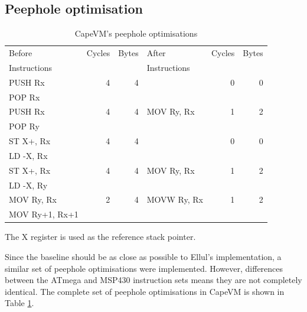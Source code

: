 \subsection{Peephole optimisation}
\begin{table}
\caption{CapeVM's peephole optimisations}
\label{tbl-CapeVM-peephole}
    \begin{threeparttable}
    \begin{tabular}{lrrlrr} %
    \toprule
    Before         & Cycles & Bytes   & After        & Cycles & Bytes   \\
    Instructions   &        &         & Instructions &        &         \\
    \midrule
    \midrule
    PUSH Rx        & 4      & 4       &              & 0      & 0 \\
    POP Rx         &        &         &              &        & \\
    \midrule
    PUSH Rx        & 4      & 4       & MOV Ry, Rx   & 1      & 2 \\
    POP Ry         &        &         &              &        & \\
    \midrule
    ST X+, Rx      & 4      & 4       &              & 0      & 0 \\
    LD -X, Rx      &        &         &              &        & \\
    \midrule
    ST X+, Rx      & 4      & 4       & MOV Ry, Rx   & 1      & 2 \\
    LD -X, Ry      &        &         &              &        & \\
    \midrule
    MOV Ry, Rx     & 2      & 4       & MOVW Ry, Rx  & 1      & 2 \\
    MOV Ry+1, Rx+1 &        &         &              &        & \\
    \bottomrule
    \end{tabular}
    \begin{tablenotes}
    \item The X register is used as the reference stack pointer.
    \end{tablenotes}
    \end{threeparttable}
\end{table}

Since the baseline should be as close as possible to Ellul's implementation, a similar set of peephole optimisations were implemented. However, differences between the ATmega and MSP430 instruction sets means they are not completely identical. The complete set of peephole optimisations in CapeVM is shown in Table \ref{tbl-CapeVM-peephole}.

